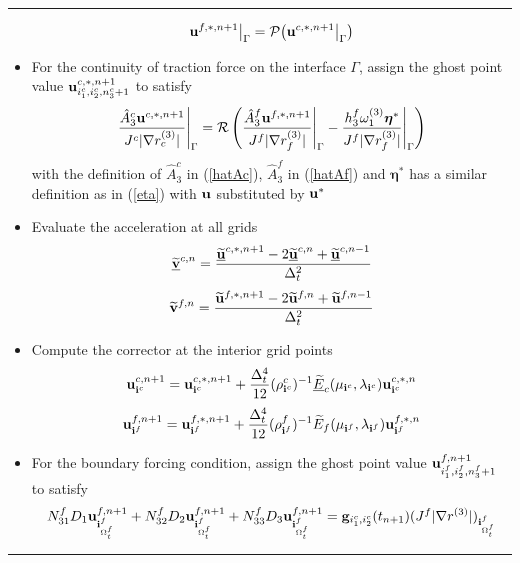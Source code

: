 \documentclass[a4paper]{article}
\makeatletter
\newenvironment{breakablealgorithm}
{%
	\begin{center}
		\refstepcounter{algorithm}%
		\hrule height.8pt depth0pt \kern2pt%
		\renewcommand{\caption}[2][\relax]{%
			{\raggedright\textbf{\ALG@name~\thealgorithm} ##2\par}%
			\ifx\relax##1\relax %
			\addcontentsline{loa}{algorithm}{\protect\numberline{\thealgorithm}##2}%
			\else %
			\addcontentsline{loa}{algorithm}{\protect\numberline{\thealgorithm}##1}%
			\fi
			\kern2pt\hrule\kern2pt
		}
	}{%
		\kern2pt\hrule\relax%
	\end{center}
}
\newcommand{\wt}{\widetilde}
\makeatother
\begin{document}
\begin{breakablealgorithm}
\begin{itemize}
{  	\begin{equation*}
  	{\bf u}^{f,*,n+1}\big|_{\Gamma} = \mathcal{P}\big({\bf u}^{c,*,n+1}\big|_{\Gamma}\big)
  	\end{equation*}
  }
  \item{For the continuity of traction force on the interface $\Gamma$, assign the ghost point value ${\bf u}^{c,*,n+1}_{i_1^c,i_2^c,n_3^c+1}$ to satisfy
  	\begin{equation}\label{traction_gamma_pre}
  	\frac{\hat{A}_3^c{\bf u}^{c,*,n+1}}{J^c|\nabla r_c^{(3)}|}\Bigg|_{\Gamma} = \mathcal{R}\left(\frac{\hat{A}_3^f{\bf u}^{f,*,n+1}}{J^f|\nabla r_f^{(3)}|}\Bigg|_{\Gamma} - \frac{h_3^f\omega_1^{(3)}{\bm \eta}^*}{J^f|\nabla r_f^{(3)}|}\Bigg|_{\Gamma}\right)
  	\end{equation}
  	with the definition of $\hat{A}^c_3$ in (\ref{hatAc}), $\hat{A}^f_3$ in (\ref{hatAf}) and ${\bm \eta}^*$ has a similar definition as in (\ref{eta}) with ${\bf u}$ substituted by ${\bf u}^*$
  }
  \item{Evaluate the acceleration at all grids 
  	\begin{equation*}
  	\uline{\wt{\bf v}}^{c,n} = \frac{\uline{\wt{\bf u}}^{c,*,n+1}-2\uline{\wt{\bf u}}^{c,n}+\uline{\wt{\bf u}}^{c,n-1}}{\Delta^2_t}
  	\end{equation*}
  	\begin{equation*}
  	\wt{\bf v}^{f,n} = \frac{\wt{\bf u}^{f,*,n+1}-2\wt{\bf u}^{f,n}+\wt{\bf u}^{f,n-1}}{\Delta^2_t}
  	\end{equation*}
  }
  \item{Compute the corrector at the interior grid points
  	\begin{equation*}
  	{\bf u}^{c,n+1}_{{\bf i}^c} = {\bf u}^{c,*,n+1}_{{\bf i}^c} + \frac{\Delta_t^4}{12}(\rho^c_{{\bf i}^c})^{-1}\uline{\wt{E}}_c(\mu_{{\bf i}^c},\lambda_{{\bf i}^c}) {\bf{u}}^{c,*,n}_{{\bf i}^c}
  	\end{equation*}
  	\begin{equation*}
  		{\bf u}^{f,n+1}_{{\bf i}^f} = {\bf u}^{f,*,n+1}_{{\bf i}^f} + \frac{\Delta_t^4}{12}(\rho^f_{{\bf i}^f})^{-1}\wt{E}_f(\mu_{{\bf i}^f},\lambda_{{\bf i}^f}) {\bf{u}}^{f,*,n}_{{\bf i}^f}
  	\end{equation*}
  }
 \item {For the boundary forcing condition, assign the ghost point value ${\bf u}^{f,n+1}_{i^f_1,i^f_2,n_3^f+1}$ to satisfy
 		\begin{equation*}
 	N_{31}^fD_1{\bf u}^{f,n+1}_{{\bf i}^f_{\Omega^f_t}} + N_{32}^fD_2{\bf u}^{f,n+1}_{{\bf i}^f_{\Omega^f_t}} + N_{33}^fD_3{\bf u}^{f,n+1}_{{\bf i}^f_{\Omega^f_t}} = {\bf g}_{i^c_1,i^c_2}(t_{n+1})(J^f|\nabla r^{(3)}|)_{{\bf i}^f_{\Omega^f_t}}

\end{equation*}}
\end{itemize}
\end{breakablealgorithm}
\end{document}
